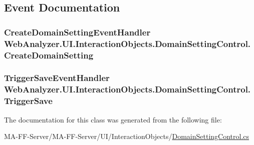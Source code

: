 \subsection{Event Documentation}
\hypertarget{class_web_analyzer_1_1_u_i_1_1_interaction_objects_1_1_domain_setting_control_aff18f63d7e7cb4b8c5d62b881bfc685c}{}
\subsubsection[{Create\+Domain\+Setting}]{\setlength{\rightskip}{0pt plus 5cm}Create\+Domain\+Setting\+Event\+Handler Web\+Analyzer.\+U\+I.\+Interaction\+Objects.\+Domain\+Setting\+Control.\+Create\+Domain\+Setting}\label{class_web_analyzer_1_1_u_i_1_1_interaction_objects_1_1_domain_setting_control_aff18f63d7e7cb4b8c5d62b881bfc685c}
\hypertarget{class_web_analyzer_1_1_u_i_1_1_interaction_objects_1_1_domain_setting_control_a1daa9c774e823427b39110bc42ff0ccd}{}
\subsubsection[{Trigger\+Save}]{\setlength{\rightskip}{0pt plus 5cm}Trigger\+Save\+Event\+Handler Web\+Analyzer.\+U\+I.\+Interaction\+Objects.\+Domain\+Setting\+Control.\+Trigger\+Save}\label{class_web_analyzer_1_1_u_i_1_1_interaction_objects_1_1_domain_setting_control_a1daa9c774e823427b39110bc42ff0ccd}


The documentation for this class was generated from the following file\+:\begin{DoxyCompactItemize}
\item 
M\+A-\/\+F\+F-\/\+Server/\+M\+A-\/\+F\+F-\/\+Server/\+U\+I/\+Interaction\+Objects/\hyperlink{_domain_setting_control_8cs}{Domain\+Setting\+Control.\+cs}\end{DoxyCompactItemize}
